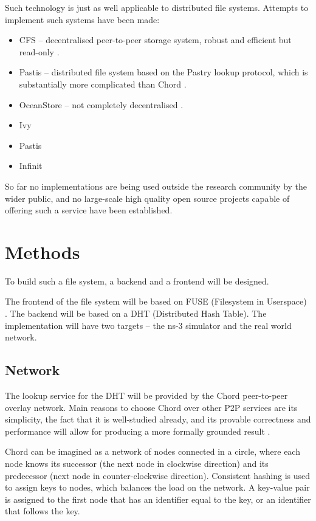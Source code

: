 \documentclass[8pt,a4paper]{article}
\begin{document}
Such technology is just as well applicable to distributed file systems. Attempts to implement such systems have been made:
\begin{itemize}
  \item CFS -- decentralised peer-to-peer storage system, robust and efficient but read-only \cite{cfs}.
  \item Pastis -- distributed file system based on the Pastry lookup protocol, which is substantially more complicated than Chord \cite{chord}.
  \item OceanStore -- not completely decentralised \cite{oceanstore}.
  \item Ivy \cite{ivy}
  \item Pastis \cite{pastis}
  \item Infinit \cite{towards}
\end{itemize}

So far no implementations are being used outside the research community by the wider public, and no large-scale high quality open source projects capable of offering such a service have been established.

\section{Methods}

To build such a file system, a backend and a frontend will be designed.

The frontend of the file system will be based on FUSE (Filesystem in Userspace) \cite{fuse}.
The backend will be based on a DHT (Distributed Hash Table). 
The implementation will have two targets -- the ns-3 \cite{ns3} simulator and the real world network.

\subsection{Network}
The lookup service for the DHT will be provided by the Chord peer-to-peer overlay network. Main reasons to choose Chord over other P2P services are its simplicity, the fact that it is well-studied already, and its provable correctness and performance will allow for producing a more formally grounded result \cite{chord}. %

Chord can be imagined as a network of nodes connected in a circle, where each node knows its successor (the next node in clockwise direction) and its predecessor (next node in counter-clockwise direction). Consistent hashing is used to assign keys to nodes, which balances the load on the network. A key-value pair is assigned to the first node that has an identifier equal to the key, or an identifier that follows the key. 
\end{document}
